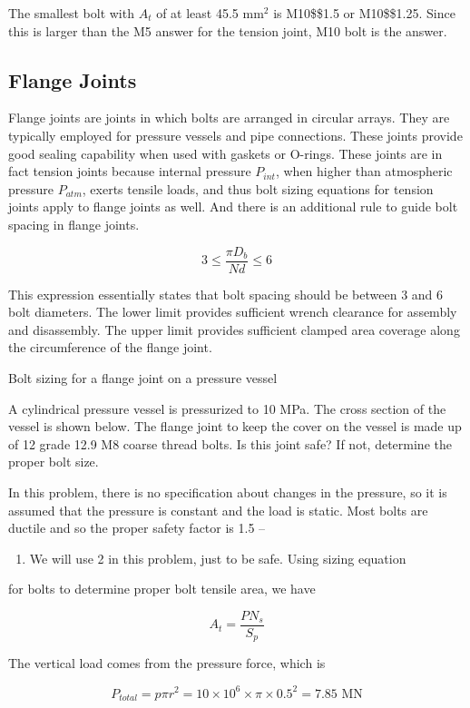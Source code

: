 \documentclass[a4paper,openany,12pt]{book}
\begin{document}
{{The smallest bolt with \(A_t\) of at least 45.5 mm\(^2\) is M10\$\texttimes{}\$1.5
or M10\$\texttimes{}\$1.25. Since this is larger than the M5 answer for the
tension joint, M10 bolt is the answer.

\subsection{Flange Joints}
\label{flange-joints}
Flange joints are joints in which bolts are arranged in circular arrays.
They are typically employed for pressure vessels and pipe connections.
These joints provide good sealing capability when used with gaskets or
O-rings. These joints are in fact tension joints because internal
pressure \(P_{int}\), when higher than atmospheric pressure \(P_{atm}\),
exerts tensile loads, and thus bolt sizing equations for tension joints
apply to flange joints as well. And there is an additional rule to guide
bolt spacing in flange joints.


$$3 \leqslant \frac{\pi D_b}{Nd} \leqslant 6$$

This expression essentially states that bolt spacing should be between 3
and 6 bolt diameters. The lower limit provides sufficient wrench
clearance for assembly and disassembly. The upper limit provides
sufficient clamped area coverage along the circumference of the flange
joint.

Bolt sizing for a flange joint on a pressure vessel

A cylindrical pressure vessel is pressurized to 10 MPa. The cross
section of the vessel is shown below. The flange joint to keep the cover
on the vessel is made up of 12 grade 12.9 M8 coarse thread bolts. Is
this joint safe? If not, determine the proper bolt size.


In this problem, there is no specification about changes in the
pressure, so it is assumed that the pressure is constant and the load is
static. Most bolts are ductile and so the proper safety factor is 1.5 --
\begin{enumerate}
\item We will use 2 in this problem, just to be safe. Using sizing equation
\end{enumerate}
for bolts to determine proper bolt tensile area, we have

$$A_t = \frac{PN_s}{S_p}$$

The vertical load comes from the pressure force, which is

$$P_{total} = p\pi r^2 = 10 \times 10^6 \times \pi  \times 0.5^2 = 7.85\text{ MN}$$

}}
\end{document}

